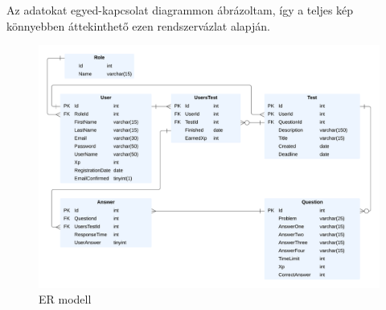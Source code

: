 \label{Adatmodell}

Az adatokat egyed-kapcsolat diagrammon ábrázoltam, így a teljes kép könnyebben áttekinthető ezen rendszervázlat alapján.

\begin{figure}[H]
    \centering
    \includegraphics[width=\linewidth]{images/TestME_ER.png}
    \caption{ER modell}
    \label{fig:TestME_ER}
\end{figure}

